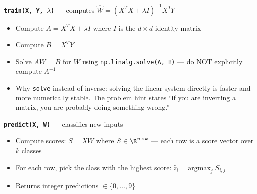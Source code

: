 \documentclass{article}
\begin{document}
\medskip
\textbf{\texttt{train(X, Y, $\lambda$)}} --- computes $\hat{W} = (X^T X + \lambda I)^{-1} X^T Y$
\begin{itemize}
    \item Compute $A = X^T X + \lambda I$ where $I$ is the $d \times d$ identity matrix
    \item Compute $B = X^T Y$
    \item Solve $AW = B$ for $W$ using \texttt{np.linalg.solve(A, B)} --- do NOT explicitly compute $A^{-1}$
    \item Why \texttt{solve} instead of inverse: solving the linear system directly is faster and more numerically stable. The problem hint states ``if you are inverting a matrix, you are probably doing something wrong.''
\end{itemize}

\medskip
\textbf{\texttt{predict(X, W)}} --- classifies new inputs
\begin{itemize}
    \item Compute scores: $S = XW$ where $S \in \R^{n \times k}$ --- each row is a score vector over $k$ classes
    \item For each row, pick the class with the highest score: $\hat{z}_i = \text{argmax}_j \; S_{i,j}$
    \item Returns integer predictions $\in \{0, \ldots, 9\}$
\end{itemize}
\end{document}
